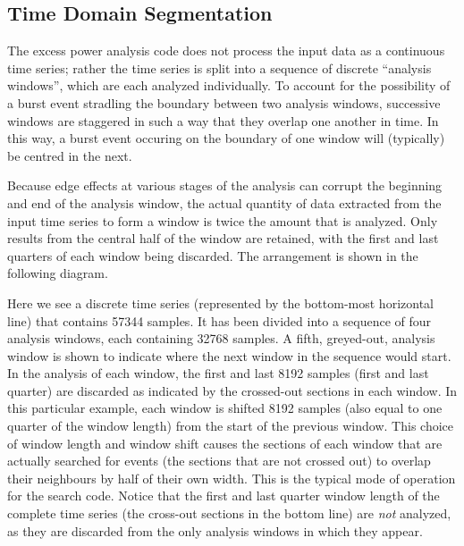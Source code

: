 \subsection{Time Domain Segmentation}
The excess power analysis code does not process the input data as a
continuous time series;  rather the time series is split into a sequence of
discrete ``analysis windows'', which are each analyzed individually.  To
account for the possibility of a burst event stradling the boundary between
two analysis windows, successive windows are staggered in such a way that
they overlap one another in time.  In this way, a burst event occuring on
the boundary of one window will (typically) be centred in the next.

Because edge effects at various stages of the analysis can corrupt the
beginning and end of the analysis window, the actual quantity of data
extracted from the input time series to form a window is twice the amount
that is analyzed.  Only results from the central half of the window are
retained, with the first and last quarters of each window being discarded.
The arrangement is shown in the following diagram.
\begin{center}

\end{center}
Here we see a discrete time series (represented by the bottom-most
horizontal line) that contains 57344 samples.  It has been divided into a
sequence of four analysis windows, each containing 32768 samples.  A fifth,
greyed-out, analysis window is shown to indicate where the next window in
the sequence would start.  In the analysis of each window, the first and
last 8192 samples (first and last quarter) are discarded as indicated by
the crossed-out sections in each window.  In this particular example, each
window is shifted 8192 samples (also equal to one quarter of the window
length) from the start of the previous window.  This choice of window
length and window shift causes the sections of each window that are
actually searched for events (the sections that are not crossed out) to
overlap their neighbours by half of their own width.  This is the typical
mode of operation for the search code.  Notice that the first and last
quarter window length of the complete time series (the cross-out sections
in the bottom line) are \emph{not} analyzed, as they are discarded from the
only analysis windows in which they appear.

